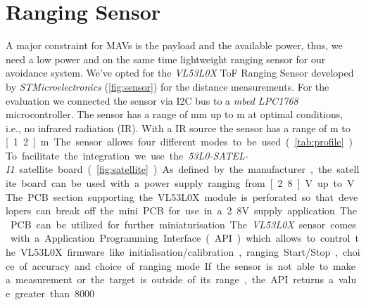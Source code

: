 \section{Ranging Sensor}
\label{sec:ranging sensor}
A major constraint for MAVs is the payload and the available power, thus, we need a low power and on the same time lightweight ranging sensor for our avoidance system. We've opted for the \textit{VL53L0X} ToF Ranging Sensor developed by \textit{STMicroelectronics} (\cref{fig:sensor}) for the distance measurements. For the evaluation we connected the sensor via I2C bus to a \textit{mbed LPC1768} microcontroller. The sensor has a range of \unit[0]{mm} up to \unit[2]{m} at optimal conditions, i.e., no infrared radiation (IR). With a IR source the sensor has a range of \unit[0]{m} to \unit[1.2]{m}.  The sensor allows four different modes to be used (\cref{tab:profile}). To facilitate the integration we use the \textit{53L0-SATEL-I1} satellite board (\cref{fig:satellite}). As defined by the manufacturer, the satellite board can be used with a power supply ranging from \unit[2.8]{V} up to \unit[5]{V}. The PCB section supporting the VL53L0X module is perforated so that developers can break off the mini PCB for use in a 2.8V supply application. The PCB can be utilized for further miniaturisation. The \textit{VL53L0X} sensor comes with a Application Programming Interface (API) which allows to control the VL53L0X firmware like initialisation/calibration, ranging Start/Stop, choice of accuracy and choice of ranging mode. If the sensor is not able to make a measurement or the target is outside of its range, the API returns a value greater than 8000 \cite{VL53L0X}.\\
